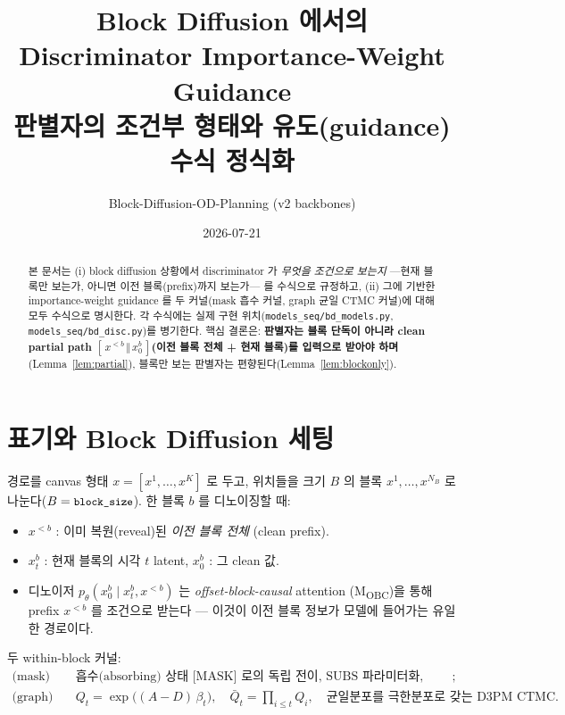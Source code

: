 \documentclass[11pt]{article}
\title{\bfseries Block Diffusion 에서의 Discriminator Importance-Weight Guidance\\[2pt]
\large 판별자의 조건부 형태와 유도(guidance) 수식 정식화}
\author{Block-Diffusion-OD-Planning \quad (v2 backbones)}
\date{2026-07-21}
\newcommand{\code}[1]{\texttt{\small #1}}
\newcommand{\xpre}{x^{<b}}        %
\newcommand{\xblk}{x^{b}}         %
\newcommand{\pth}{p_\theta}
\newcommand{\Qb}{\bar{Q}}
\theoremstyle{plain}
\theoremstyle{definition}
\begin{document}
\maketitle

\begin{abstract}
\noindent
본 문서는 (i) block diffusion 상황에서 discriminator 가 \emph{무엇을 조건으로 보는지}
—현재 블록만 보는가, 아니면 이전 블록(prefix)까지 보는가— 를 수식으로 규정하고,
(ii) 그에 기반한 importance-weight guidance 를 두 커널(mask 흡수 커널,
graph 균일 CTMC 커널)에 대해 모두 수식으로 명시한다.
각 수식에는 실제 구현 위치(\code{models\_seq/bd\_models.py},
\code{models\_seq/bd\_disc.py})를 병기한다. 핵심 결론은:
\textbf{판별자는 블록 단독이 아니라 clean partial path
$[\,\xpre \,\Vert\, \xblk_0\,]$(이전 블록 전체 + 현재 블록)를 입력으로 받아야 하며}
(Lemma~\ref{lem:partial}),
블록만 보는 판별자는 편향된다(Lemma~\ref{lem:blockonly}).
\end{abstract}

\section{표기와 Block Diffusion 세팅}

경로를 canvas 형태 $x=[x^1,\dots,x^{K}]$ 로 두고, 위치들을 크기 $B$ 의 블록
$x^1,\dots,x^{N_B}$ 로 나눈다($B=\code{block\_size}$). 한 블록 $b$ 를 디노이징할 때:
\begin{itemize}[nosep,leftmargin=1.4em]
  \item $\xpre$ : 이미 복원(reveal)된 \emph{이전 블록 전체} (clean prefix).
  \item $\xblk_t$ : 현재 블록의 시각 $t$ latent, $\xblk_0$ : 그 clean 값.
  \item 디노이저 $\pth(\xblk_0\mid \xblk_t,\xpre)$ 는 \emph{offset-block-causal} attention
        (M\textsubscript{OBC})을 통해 prefix $\xpre$ 를 조건으로 받는다
        — 이것이 이전 블록 정보가 모델에 들어가는 유일한 경로이다.
\end{itemize}

두 within-block 커널:
\begin{align}
\text{(mask)}\quad & \text{흡수(absorbing) 상태 [MASK] 로의 독립 전이, SUBS 파라미터화, first-hitting 복원};\\
\text{(graph)}\quad & Q_t=\exp\!\big((A-D)\,\beta_t\big),\quad
\Qb_t=\textstyle\prod_{i\le t}Q_i,\quad \text{균일분포를 극한분포로 갖는 D3PM CTMC}.
\end{align}
\end{document}
